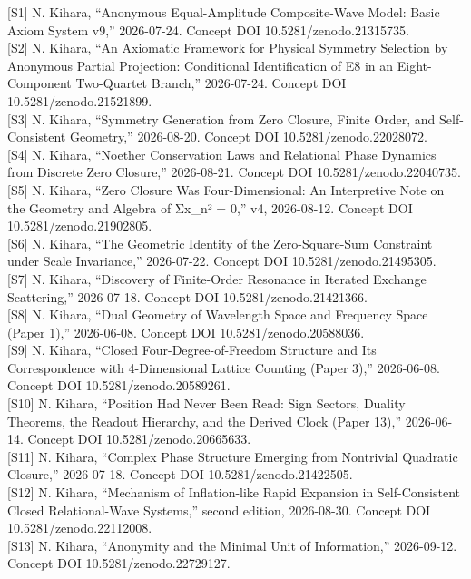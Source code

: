 \documentclass[
  a4paper,
]{article}
\begin{document}
{[}S1{]} N. Kihara, ``Anonymous Equal-Amplitude Composite-Wave Model:
Basic Axiom System v9,'' 2026-07-24. Concept DOI
10.5281/zenodo.21315735.\\
{[}S2{]} N. Kihara, ``An Axiomatic Framework for Physical Symmetry
Selection by Anonymous Partial Projection: Conditional Identification of
E8 in an Eight-Component Two-Quartet Branch,'' 2026-07-24. Concept DOI
10.5281/zenodo.21521899.\\
{[}S3{]} N. Kihara, ``Symmetry Generation from Zero Closure, Finite
Order, and Self-Consistent Geometry,'' 2026-08-20. Concept DOI
10.5281/zenodo.22028072.\\
{[}S4{]} N. Kihara, ``Noether Conservation Laws and Relational Phase
Dynamics from Discrete Zero Closure,'' 2026-08-21. Concept DOI
10.5281/zenodo.22040735.\\
{[}S5{]} N. Kihara, ``Zero Closure Was Four-Dimensional: An Interpretive
Note on the Geometry and Algebra of Σx\_n² = 0,'' v4, 2026-08-12.
Concept DOI 10.5281/zenodo.21902805.\\
{[}S6{]} N. Kihara, ``The Geometric Identity of the Zero-Square-Sum
Constraint under Scale Invariance,'' 2026-07-22. Concept DOI
10.5281/zenodo.21495305.\\
{[}S7{]} N. Kihara, ``Discovery of Finite-Order Resonance in Iterated
Exchange Scattering,'' 2026-07-18. Concept DOI
10.5281/zenodo.21421366.\\
{[}S8{]} N. Kihara, ``Dual Geometry of Wavelength Space and Frequency
Space (Paper 1),'' 2026-06-08. Concept DOI 10.5281/zenodo.20588036.\\
{[}S9{]} N. Kihara, ``Closed Four-Degree-of-Freedom Structure and Its
Correspondence with 4-Dimensional Lattice Counting (Paper 3),''
2026-06-08. Concept DOI 10.5281/zenodo.20589261.\\
{[}S10{]} N. Kihara, ``Position Had Never Been Read: Sign Sectors,
Duality Theorems, the Readout Hierarchy, and the Derived Clock (Paper
13),'' 2026-06-14. Concept DOI 10.5281/zenodo.20665633.\\
{[}S11{]} N. Kihara, ``Complex Phase Structure Emerging from Nontrivial
Quadratic Closure,'' 2026-07-18. Concept DOI 10.5281/zenodo.21422505.\\
{[}S12{]} N. Kihara, ``Mechanism of Inflation-like Rapid Expansion in
Self-Consistent Closed Relational-Wave Systems,'' second edition,
2026-08-30. Concept DOI 10.5281/zenodo.22112008.\\
{[}S13{]} N. Kihara, ``Anonymity and the Minimal Unit of Information,''
2026-09-12. Concept DOI 10.5281/zenodo.22729127.\\
\end{document}
